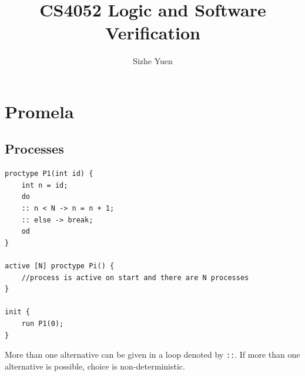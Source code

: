 \documentclass[11pt]{article}
\author{Sizhe Yuen}
\title{CS4052 Logic and Software Verification}
\theoremstyle{definition}
\begin{document}
\maketitle
\tableofcontents

\newcommand{\n}[0]{\\[\baselineskip]}

\section{Promela}

\subsection{Processes}
\begin{lstlisting}[caption={Process definition}]
proctype P1(int id) {
	int n = id;
	do 
	:: n < N -> n = n + 1;
	:: else -> break;
	od
}

active [N] proctype Pi() {
	//process is active on start and there are N processes
}

init {
	run P1(0);
}
\end{lstlisting}
More than one alternative can be given in a loop denoted by \texttt{::}. If more than one alternative is possible, choice is non-deterministic. 
\end{document}
